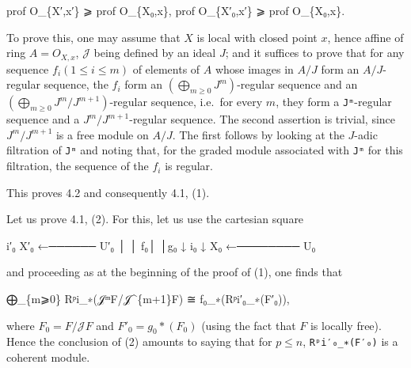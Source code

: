 \documentclass[
]{article}
\newenvironment{Shaded}{}{}
\newcommand{\NormalTok}[1]{#1}
\begin{document}
\begin{Shaded}
\begin{Highlighting}[]
\NormalTok{prof O\_\{X′,x′\} ⩾ prof O\_\{X₀,x\},  prof O\_\{X′₀,x′\} ⩾ prof O\_\{X₀,x\}.}
\end{Highlighting}
\end{Shaded}

To prove this, one may assume that \(X\) is local with closed point
\(x\), hence affine of ring \(A = O_{X,x}\), \(\mathcal{J}\) being
defined by an ideal \(J\); and it suffices to prove that for any
sequence \(f_{i} (1 \leqslant i \leqslant m)\) of elements of \(A\)
whose images in \(A/J\) form an \(A/J\)-regular sequence, the \(f_{i}\)
form an \((\bigoplus_{m\geqslant 0} J^{m})\)-regular sequence and an
\((\bigoplus_{m\geqslant 0} J^{m}/J^{m+1})\)-regular sequence, i.e.~for
every \(m\), they form a \texttt{Jᵐ}-regular sequence and a
\(J^{m}/J^{m+1}\)-regular sequence. The second assertion is trivial,
since \(J^{m}/J^{m+1}\) is a free module on \(A/J\). The first follows
by looking at the \(J\)-adic filtration of \texttt{Jᵐ} and noting that,
for the graded module associated with \texttt{Jᵐ} for this filtration,
the sequence of the \(f_{i}\) is regular.

This proves 4.2 and consequently 4.1, (1).

Let us prove 4.1, (2). For this, let us use the cartesian square

\begin{Shaded}
\begin{Highlighting}[]
\NormalTok{        i′₀}
\NormalTok{X′₀ ←────── U′₀}
\NormalTok{│            │}
\NormalTok{f₀│            │g₀}
\NormalTok{↓     i₀     ↓}
\NormalTok{X₀ ←──────── U₀}
\end{Highlighting}
\end{Shaded}

and proceeding as at the beginning of the proof of (1), one finds that

\begin{Shaded}
\begin{Highlighting}[]
\NormalTok{⨁\_\{m⩾0\} Rᵖi\_∗(𝒥ᵐF/𝒥\^{}\{m+1\}F) ≅ f₀\_∗(Rᵖi′₀\_∗(F′₀)),}
\end{Highlighting}
\end{Shaded}

where \(F_{0} = F/\mathcal{J}F\) and \(F'_{0} = g_{0}*(F_{0})\) (using
the fact that \(F\) is locally free). Hence the conclusion of (2)
amounts to saying that for \(p \leqslant n\), \texttt{Rᵖi′₀\_∗(F′₀)} is
a coherent module.
\end{document}
